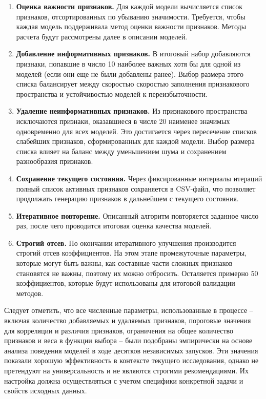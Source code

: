 \documentclass[a4paper,12pt]{article}
\begin{document}
\begin{enumerate}
      \item \textbf{Оценка важности признаков.}
      Для каждой модели вычисляется список признаков, отсортированных по убыванию значимости. Требуется, чтобы каждая модель поддерживала метод оценки важности признаков. Методы расчета будут рассмотрены далее в описании моделей.
      
      \item \textbf{Добавление информативных признаков.}
      В итоговый набор добавляются признаки, попавшие в число 10 наиболее важных хотя бы для одной из моделей (если они еще не были добавлены ранее). Выбор размера этого списка балансирует между скоростью скоростью заполнения признакового пространства и устойчивостью моделей к переизбыточности.
      
      \item \textbf{Удаление неинформативных признаков.}
      Из признакового пространства исключаются признаки, оказавшиеся в числе 20 наименее значимых одновременно для всех моделей. Это достигается через пересечение списков слабейших признаков, сформированных для каждой модели. Выбор размера списка влияет на баланс между уменьшением шума и сохранением разнообразия признаков.
      
      \item \textbf{Сохранение текущего состояния.}
      Через фиксированные интервалы итераций полный список активных признаков сохраняется в CSV-файл, что позволяет продолжать генерацию признаков в дальнейшем с текущего состояния.
      
      \item \textbf{Итеративное повторение.}
      Описанный алгоритм повторяется заданное число раз, после чего проводится итоговая оценка качества моделей.

      \item \textbf{Строгий отсев.}
      По окончании итеративного улучшения производится строгий отсев коэффициентов. На этом этапе промежуточные параметры, которые могут быть важны, как составные части сложных признаков становятся не важны, поэтому их можно отбросить. Осталяется примерно 50 коэффициентов, которые будут использованы для итоговой валидации методов.
    \end{enumerate}
    
    Следует отметить, что все численные параметры, использованные в процессе -- включая количество добавляемых и удаляемых признаков, пороговые значения для корреляции и различия признаков, ограничения на общее количество признаков и веса в функции выбора -- были подобраны эмпирически на основе анализа поведения моделей в ходе десятков независимых запусков. Эти значения показали хорошую эффективность в контексте текущего исследования, однако не претендуют на универсальность и не являются строгими рекомендациями. Их настройка должна осуществляться с учетом специфики конкретной задачи и свойств исходных данных.
\end{document}
